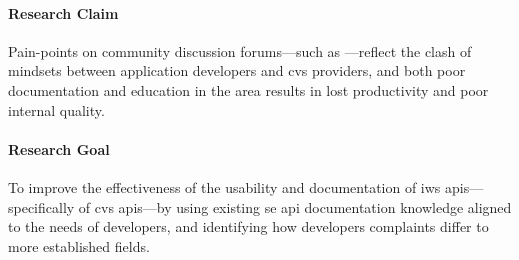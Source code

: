 
\paragraph{Research Claim}
Pain-points on community discussion forums---such as ---reflect the clash of mindsets between application developers and  \gls{cvs} providers, and both poor documentation and education in the area results in lost productivity and poor internal quality.

\paragraph{Research Goal}
To improve the effectiveness of the usability and documentation of \gls{iws} \glspl{api}---specifically of \gls{cvs} \glspl{api}---by using existing \gls{se} \gls{api} documentation knowledge aligned to the needs of developers, and identifying how developers complaints differ to more established fields. 

